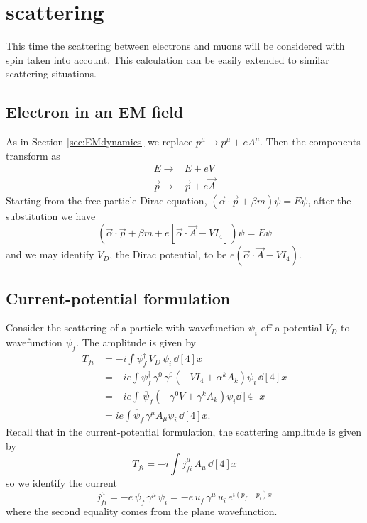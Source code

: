 \chapter{\Pelectron \Pmuon scattering}
This time the scattering between electrons and muons will be considered with spin taken into account. This calculation can be easily extended to similar scattering situations.

\section{Electron in an EM field}
As in Section \ref{sec:EMdynamics} we replace $p^\mu \rightarrow p^\mu + eA^\mu$. Then the components transform as
\begin{align}
E \rightarrow & E + eV \\
\vec{p} \rightarrow & \vec{p} + e\vec{A}
\end{align}
Starting from the free particle Dirac equation, $(\vec{\alpha}\cdot\vec{p} + \beta m)\psi = E\psi$, after the substitution we have
\begin{equation}
\left( \vec{\alpha}\cdot\vec{p} + \beta m + e\left[ \vec{\alpha}\cdot\vec{A} - VI_4 \right] \right) \psi = E\psi
\end{equation}
and we may identify $V_D$, the Dirac potential, to be $e\left( \vec{\alpha}\cdot\vec{A} - VI_4 \right)$.

\section{Current-potential formulation}
Consider the scattering of a particle with wavefunction $\psi_i$ off a potential $V_D$ to wavefunction $\psi_f$. The amplitude is given by
\begin{align}
T_{fi} &= -i \int \psi_f^\dagger \, V_D \, \psi_i \, \dd[4]{x} \\
&= -ie \int \psi_f^\dagger \, \gamma^0 \, \gamma^0 \left( -VI_4 + \alpha^k A_k \right) \psi_i \, \dd[4]{x} \nonumber \\
&= -ie \int \, \overline{\psi}_f \left( -\gamma^0 V + \gamma^k A_k \right) \psi_i\dd[4]{x} \nonumber \\
&= ie \int \overline{\psi}_f \, \gamma^\mu A_\mu \psi_i \, \dd[4]{x}.
\end{align}
Recall that in the current-potential formulation, the scattering amplitude is given by
\begin{equation}
T_{fi} = -i \int j^\mu_{fi} \, A_\mu \, \dd[4]{x}
\end{equation}
so we identify the current
\begin{equation}
j^\mu_{fi} = -e \, \overline{\psi}_f \, \gamma^\mu \, \psi_i = -e \, \overline{u}_f \, \gamma^\mu \, u_i \, e^{i(p_f - p_i)x}
\end{equation}
where the second equality comes from the plane wavefunction.

